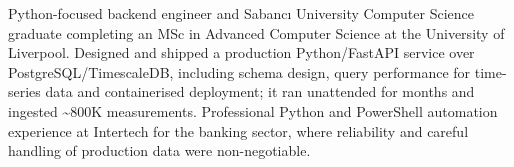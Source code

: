 
\newcommand{\cvprojects}{onepage_projects_backend}



Python-focused backend engineer and Sabancı University Computer Science graduate completing an MSc in Advanced Computer Science at the University of Liverpool. Designed and shipped a production Python/FastAPI service over PostgreSQL/TimescaleDB, including schema design, query performance for time-series data and containerised deployment; it ran unattended for months and ingested \textasciitilde 800K measurements. Professional Python and PowerShell automation experience at Intertech for the banking sector, where reliability and careful handling of production data were non-negotiable.




